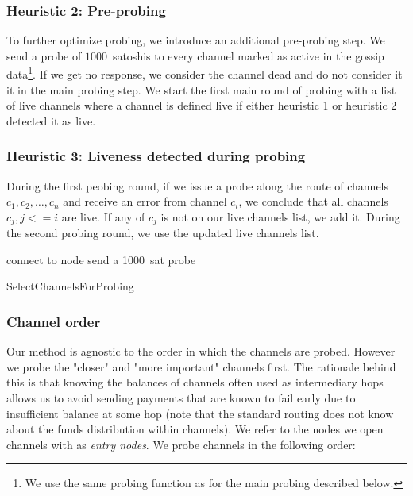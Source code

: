 \subsubsection*{Heuristic 2: Pre-probing}
To further optimize probing, we introduce an additional pre-probing step.
We send a probe of $1000$~satoshis to every channel marked as active in the gossip data\footnote{We use the same probing function as for the main probing described below.}.
If we get no response, we consider the channel dead and do not consider it it in the main probing step.
We start the first main round of probing with a list of live channels where a channel is defined live if either heuristic 1 or heuristic 2 detected it as live.

\subsubsection*{Heuristic 3: Liveness detected during probing}
During the first peobing round, if we issue a probe along the route of channels $c_1, c_2, \dots, c_n$ and receive an error from channel $c_i$, we conclude that all channels $c_j, j<=i$ are live.
If any of $c_j$ is not on our live channels list, we add it.
During the second probing round, we use the updated live channels list.

\begin{algorithm}
	 {
		connect to node\;
	}
	 {
		send a 1000~sat probe\;
	}
	\caption{SelectChannelsForProbing}
	\label{alg:select-channels}
\end{algorithm}


\subsubsection*{Channel order}
Our method is agnostic to the order in which the channels are probed.
However we probe the "closer" and "more important" channels first.
The rationale behind this is that knowing the balances of channels often used as intermediary hops allows us to avoid sending payments that are known to fail early due to insufficient balance at some hop (note that the standard routing does not know about the funds distribution within channels).
We refer to the nodes we open channels with as \textit{entry nodes}.
We probe channels in the following order:

